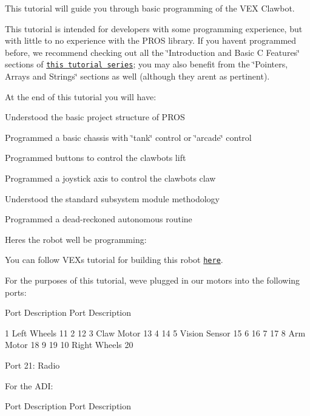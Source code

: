 This tutorial will guide you through basic programming of the V\+EX Clawbot.

This tutorial is intended for developers with some programming experience, but with little to no experience with the P\+R\+OS library. If you haven\textquotesingle{}t programmed before, we recommend checking out all the \char`\"{}\+Introduction and Basic C Features\char`\"{} sections of \href{http://www.studytonight.com/c/overview-of-c.php}{\tt this tutorial series}; you may also benefit from the \char`\"{}\+Pointers, Arrays and Strings\char`\"{} sections as well (although they aren\textquotesingle{}t as pertinent).

At the end of this tutorial you will have\+:


\begin{DoxyItemize}
\item Understood the basic project structure of P\+R\+OS
\item Programmed a basic chassis with \char`\"{}tank\char`\"{} control or \char`\"{}arcade\char`\"{} control
\item Programmed buttons to control the clawbot\textquotesingle{}s lift
\item Programmed a joystick axis to control the clawbot\textquotesingle{}s claw
\item Understood the standard subsystem module methodology
\item Programmed a dead-\/reckoned autonomous routine
\end{DoxyItemize}

Here\textquotesingle{}s the robot we\textquotesingle{}ll be programming\+:



You can follow V\+EX\textquotesingle{}s tutorial for building this robot \href{https://v5beta.vex.com/parent-wrapper.php?id=v5-with-clawbot}{\tt here}.

For the purposes of this tutorial, we\textquotesingle{}ve plugged in our motors into the following ports\+:

Port Description Port Description 



1 Left Wheels 11 2 12 3 Claw Motor 13 4 14 5 Vision Sensor 15 6 16 7 17 8 Arm Motor 18 9 19 10 Right Wheels 20

Port 21\+: Radio

For the A\+DI\+:

Port Description Port Description 



